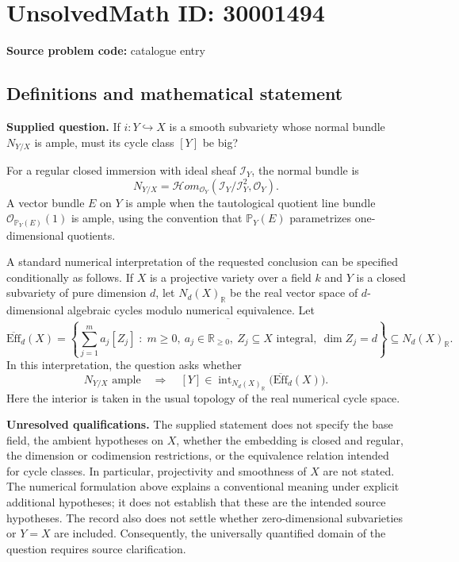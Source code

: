 \documentclass[11pt]{article}
\begin{document}
\section*{UnsolvedMath ID: 30001494}
\textbf{Source problem code:} catalogue entry
\subsection{Definitions and mathematical statement}
\textbf{Supplied question.} If \(i\colon Y\hookrightarrow X\) is a smooth subvariety whose normal bundle \(N_{Y/X}\) is ample, must its cycle class \([Y]\) be big?

For a regular closed immersion with ideal sheaf \(\mathcal I_Y\), the normal bundle is
\[
N_{Y/X}=\mathcal{H}om_{\mathcal O_Y}(\mathcal I_Y/\mathcal I_Y^2,\mathcal O_Y).
\]
A vector bundle \(E\) on \(Y\) is ample when the tautological quotient line bundle \(\mathcal O_{\mathbb P_Y(E)}(1)\) is ample, using the convention that \(\mathbb P_Y(E)\) parametrizes one-dimensional quotients.

A standard numerical interpretation of the requested conclusion can be specified conditionally as follows. If \(X\) is a projective variety over a field \(k\) and \(Y\) is a closed subvariety of pure dimension \(d\), let \(N_d(X)_{\mathbb R}\) be the real vector space of \(d\)-dimensional algebraic cycles modulo numerical equivalence. Let
\[
\overline{\mathrm{Eff}}_d(X)
=\overline{\left\{\sum_{j=1}^{m}a_j[Z_j]\;:\;m\geq 0,\ a_j\in\mathbb R_{\geq 0},\ Z_j\subseteq X\text{ integral},\ \dim Z_j=d\right\}}
\subseteq N_d(X)_{\mathbb R}.
\]
In this interpretation, the question asks whether
\[
N_{Y/X}\text{ ample}
\quad\Longrightarrow\quad
[Y]\in\operatorname{int}_{N_d(X)_{\mathbb R}}\bigl(\overline{\mathrm{Eff}}_d(X)\bigr).
\]
Here the interior is taken in the usual topology of the real numerical cycle space.

\textbf{Unresolved qualifications.} The supplied statement does not specify the base field, the ambient hypotheses on \(X\), whether the embedding is closed and regular, the dimension or codimension restrictions, or the equivalence relation intended for cycle classes. In particular, projectivity and smoothness of \(X\) are not stated. The numerical formulation above explains a conventional meaning under explicit additional hypotheses; it does not establish that these are the intended source hypotheses. The record also does not settle whether zero-dimensional subvarieties or \(Y=X\) are included. Consequently, the universally quantified domain of the question requires source clarification.
\end{document}
